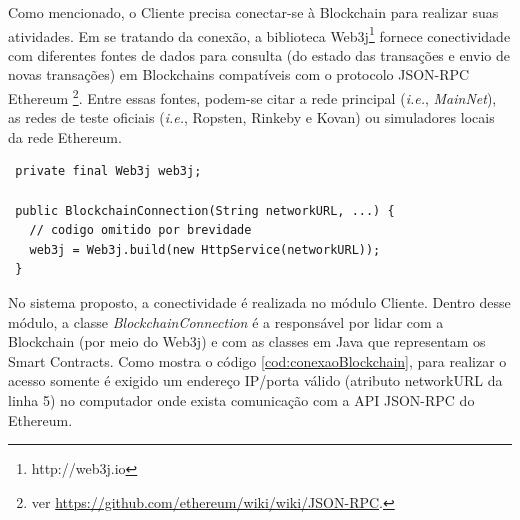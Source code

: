 \documentclass[a4paper,11pt]{article}
\begin{document}





Como mencionado, o Cliente precisa conectar-se à Blockchain para realizar suas atividades.
Em se tratando da conexão, a biblioteca Web3j\footnote{http://web3j.io} fornece conectividade com diferentes fontes de dados para consulta (do estado das transações e envio de novas transações) em Blockchains compatíveis com o protocolo JSON-RPC Ethereum
\footnote{ver \href{https://github.com/ethereum/wiki/wiki/JSON-RPC}{https://github.com/ethereum/wiki/wiki/JSON-RPC}.}.
Entre essas fontes, podem-se citar a rede principal (\emph{i.e.}, \emph{MainNet}), as redes de teste oficiais (\emph{i.e.}, Ropsten, Rinkeby e Kovan) ou simuladores locais da rede Ethereum. %


\begin{lstlisting}
 private final Web3j web3j;

 public BlockchainConnection(String networkURL, ...) {
   // codigo omitido por brevidade
   web3j = Web3j.build(new HttpService(networkURL));
 }
\end{lstlisting}


No sistema proposto, a conectividade é realizada no módulo Cliente.
Dentro desse módulo, a classe \emph{BlockchainConnection} é a responsável por lidar com a Blockchain (por meio do Web3j) e com as classes em Java que representam os Smart Contracts. Como mostra o código \ref{cod:conexaoBlockchain}, para realizar o acesso  somente é exigido um endereço IP/porta válido (atributo networkURL da linha 5) no computador onde exista comunicação com a API JSON-RPC do Ethereum.%
\end{document}
